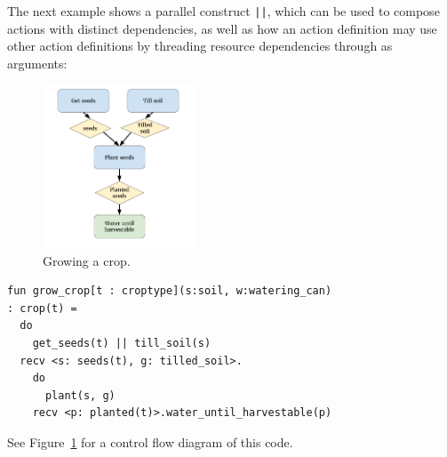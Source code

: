 The next example shows a parallel construct \verb/||/, which can be used to
compose actions with distinct dependencies, as well as
how an action definition may use other action definitions by threading
resource dependencies through as arguments:
%
\begin{figure}[t]
  \includegraphics[width=0.4\textwidth]{sdv-grow-crop.png}
  \caption{Growing a crop.}
  \label{fig:grow}
\end{figure}
%
\begin{verbatim}
fun grow_crop[t : croptype](s:soil, w:watering_can)
: crop(t) =
  do
    get_seeds(t) || till_soil(s)
  recv <s: seeds(t), g: tilled_soil>.
    do
      plant(s, g)
    recv <p: planted(t)>.water_until_harvestable(p)
\end{verbatim}
See Figure~\ref{fig:grow} for a control flow diagram of this code.

 
% 
% 

